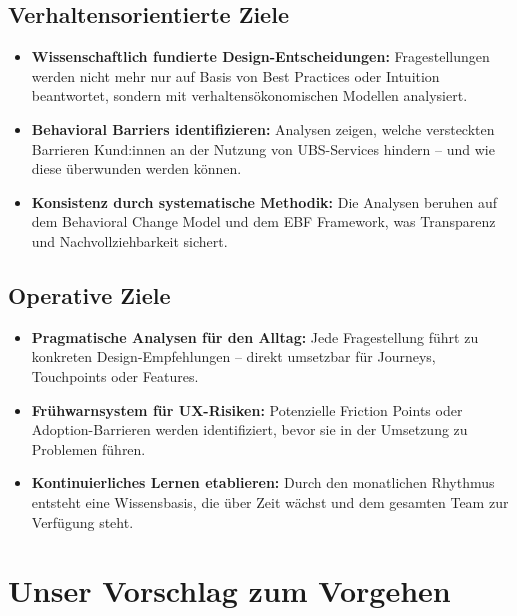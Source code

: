 \documentclass{fehradvice-report}
\begin{document}
\subsection{Verhaltensorientierte Ziele}

\begin{itemize}
    \item[$\checkmark$] \textbf{Wissenschaftlich fundierte Design-Entscheidungen:} Fragestellungen werden nicht mehr nur auf Basis von Best Practices oder Intuition beantwortet, sondern mit verhaltensökonomischen Modellen analysiert.
    \item[$\checkmark$] \textbf{Behavioral Barriers identifizieren:} Analysen zeigen, welche versteckten Barrieren Kund:innen an der Nutzung von UBS-Services hindern -- und wie diese überwunden werden können.
    \item[$\checkmark$] \textbf{Konsistenz durch systematische Methodik:} Die Analysen beruhen auf dem Behavioral Change Model und dem EBF Framework, was Transparenz und Nachvollziehbarkeit sichert.
\end{itemize}

\subsection{Operative Ziele}

\begin{itemize}
    \item[$\checkmark$] \textbf{Pragmatische Analysen für den Alltag:} Jede Fragestellung führt zu konkreten Design-Empfehlungen -- direkt umsetzbar für Journeys, Touchpoints oder Features.
    \item[$\checkmark$] \textbf{Frühwarnsystem für UX-Risiken:} Potenzielle Friction Points oder Adoption-Barrieren werden identifiziert, bevor sie in der Umsetzung zu Problemen führen.
    \item[$\checkmark$] \textbf{Kontinuierliches Lernen etablieren:} Durch den monatlichen Rhythmus entsteht eine Wissensbasis, die über Zeit wächst und dem gesamten Team zur Verfügung steht.
\end{itemize}

\newpage
\section{Unser Vorschlag zum Vorgehen}
\end{document}

